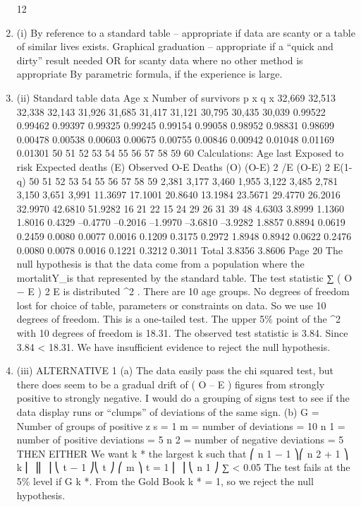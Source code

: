 \documentclass[a4paper,12pt]{article}
\begin{document}
\begin{enumerate}
12
\item (i)
By reference to a standard table – appropriate if data are scanty or a table of
similar lives exists.
Graphical graduation – appropriate if a “quick and dirty” result needed OR
for scanty data where no other method is appropriate
By parametric formula, if the experience is large.
\item (ii)
Standard table data
Age x
Number of survivors p x q x
32,669
32,513
32,338
32,143
31,926
31,685
31,417
31,121
30,795
30,435
30,039 0.99522
0.99462
0.99397
0.99325
0.99245
0.99154
0.99058
0.98952
0.98831
0.98699 0.00478
0.00538
0.00603
0.00675
0.00755
0.00846
0.00942
0.01048
0.01169
0.01301
50
51
52
53
54
55
56
57
58
59
60
Calculations:
Age last Exposed
to risk Expected
deaths (E) Observed
O-E
Deaths (O) (O-E) 2 /E (O-E) 2
E(1-q)
50
51
52
53
54
55
56
57
58
59 2,381
3,177
3,460
1,955
3,122
3,485
2,781
3,150
3,651
3,991 11.3697
17.1001
20.8640
13.1984
23.5671
29.4770
26.2016
32.9970
42.6810
51.9282 16
21
22
15
24
29
26
31
39
48 4.6303
3.8999
1.1360
1.8016
0.4329
–0.4770
–0.2016
–1.9970
–3.6810
–3.9282 1.8857
0.8894
0.0619
0.2459
0.0080
0.0077
0.0016
0.1209
0.3175
0.2972 1.8948
0.8942
0.0622
0.2476
0.0080
0.0078
0.0016
0.1221
0.3212
0.3011
Total 3.8356 3.8606
Page 20 %
The null hypothesis is that the data come from a population where the
mortalitY_is that represented by the standard table.
The test statistic
∑
( O − E ) 2
E
is distributed \chi^2 .
There are 10 age groups.
No degrees of freedom lost for choice of table, parameters or constraints on
data.
So we use 10 degrees of freedom.
This is a one-tailed test.
The upper 5\% point of the \chi^2 with 10 degrees of freedom is 18.31.
The observed test statistic is 3.84.
Since 3.84 < 18.31.
We have insufficient evidence to reject the null hypothesis.
\item (iii)
ALTERNATIVE 1
(a) The data easily pass the chi squared test, but there does seem to be a
gradual drift of ( O – E ) figures from strongly positive to strongly
negative. I would do a grouping of signs test to see if the data
display runs or “clumps” of deviations of the same sign.
(b) G = Number of groups of positive z s = 1
m = number of deviations = 10
n 1 = number of positive deviations = 5
n 2 = number of negative deviations = 5
THEN EITHER
We want k * the largest k such that
⎛ n 1 − 1 ⎞⎛ n 2 + 1 ⎞
k ⎜
⎟⎜
⎟
⎝ t − 1 ⎠⎝ t ⎠
⎛ m ⎞
t = 1
⎜ ⎟
⎝ n 1 ⎠
∑
< 0.05
The test fails at the 5\% level if G \leq k *.
From the Gold Book k * = 1, so we reject the null hypothesis.

\end{enumerate}
\end{document}
